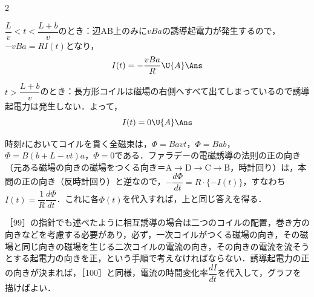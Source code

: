 \begin{multicols}{2}
\begin{komon}
\item[{\makebox[1.9zw][r]{\MARU{3}}}] $\dfrac{L}{v}<t<\dfrac{L+b}{v}$のとき：辺$\mathrm{AB}$上のみに$vBa$の誘導起電力が発生するので，$-vBa=RI(t)$となり，
       \[I(t)=-\frac{vBa}{R}\U{A}\Ans\]
\item[{\makebox[1.9zw][r]{\MARU{4}}}] $t>\dfrac{L+b}{v}$のとき：長方形コイルは磁場の右側へすべて出てしまっているので誘導起電力は発生しない．よって，
       \[I(t)=0\U{A}\Ans\]
\end{komon}
\begin{bekkai}
時刻$t$においてコイルを貫く全磁束は，$\varPhi=Bavt$，$\varPhi=Bab$，$\varPhi=B(b+L-vt)a$，$\varPhi=0$である．ファラデーの電磁誘導の法則の正の向き（元ある磁場の向きの磁場をつくる向き＝$\mathrm{A}\to\mathrm{D}\to\mathrm{C}\to\mathrm{B}$，時計回り）は，本問の正の向き（反時計回り）と逆なので，$-\dfrac{d\varPhi}{dt}=R\cdot\{-I(t)\}$，すなわち$I(t)=\dfrac{1}{R}\dfrac{d\varPhi}{dt}$．これに各$\varPhi(t)$を代入すれば，上と同じ答えを得る．
\end{bekkai}

\par\nopagebreak
\begin{sisin}
［99］の指針でも述べたように相互誘導の場合は二つのコイルの配置，巻き方の向きなどを考慮する必要があり，必ず，一次コイルがつくる磁場の向き，その磁場と同じ向きの磁場を生じる二次コイルの電流の向き，その向きの電流を流そうとする起電力の向きを正，という手順で考えなければならない．誘導起電力の正の向きが決まれば，［100］と同様，電流の時間変化率$\dfrac{dI}{dt}$を代入して，グラフを描けばよい．


\end{sisin}
\end{multicols}
